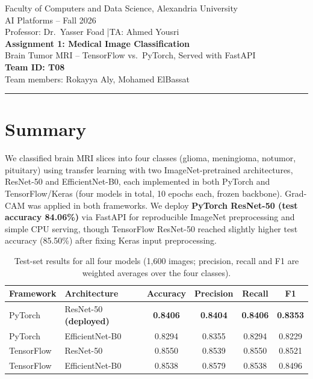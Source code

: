 \documentclass[11pt,a4paper]{article}
\newcommand{\TeamID}{T08}
\begin{document}
\begin{center}
  {\large Faculty of Computers and Data Science, Alexandria University}\\[2pt]
  {\large AI Platforms -- Fall 2026}\\[2pt]
  Professor: Dr.\ Yasser Foad \quad|\quad TA: Ahmed Yousri\\[14pt]
  {\LARGE\bfseries Assignment 1: Medical Image Classification}\\[4pt]
  {\Large Brain Tumor MRI -- TensorFlow vs.\ PyTorch, Served with FastAPI}\\[12pt]
  {\large\bfseries Team ID: \TeamID}\\[4pt]
  Team members: {Rokayya Aly, Mohamed ElBassat}
\end{center}
\vspace{4pt}
\hrule
\vspace{8pt}

\section*{Summary}
We classified brain MRI slices into four classes (glioma, meningioma, notumor, pituitary) using transfer learning with two ImageNet-pretrained architectures, ResNet-50 and EfficientNet-B0, each implemented in both PyTorch and TensorFlow/Keras (four models in total, 10 epochs each, frozen backbone). Grad-CAM was applied in both frameworks. We deploy \textbf{PyTorch ResNet-50 (test accuracy 84.06\%)} via FastAPI for reproducible ImageNet preprocessing and simple CPU serving, though TensorFlow ResNet-50 reached slightly higher test accuracy (85.50\%) after fixing Keras input preprocessing.

\begin{table}[H]
\centering
\caption{Test-set results for all four models (1{,}600 images; precision, recall and F1 are weighted averages over the four classes).}
\label{tab:summary}
\begin{tabular}{llcccc}
\toprule
Framework & Architecture & Accuracy & Precision & Recall & F1 \\
\midrule
PyTorch    & ResNet-50 \textbf{(deployed)} & \textbf{0.8406} & \textbf{0.8404} & \textbf{0.8406} & \textbf{0.8353} \\
PyTorch    & EfficientNet-B0               & 0.8294 & 0.8355 & 0.8294 & 0.8229 \\
TensorFlow & ResNet-50                     & 0.8550 & 0.8539 & 0.8550 & 0.8521 \\
TensorFlow & EfficientNet-B0               & 0.8538 & 0.8579 & 0.8538 & 0.8496 \\
\bottomrule
\end{tabular}
\end{table}
\end{document}
